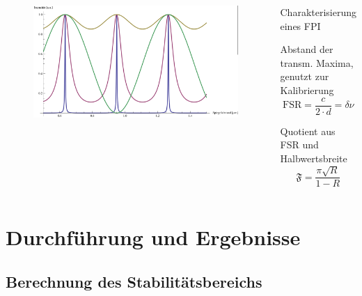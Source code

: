 \documentclass[10pt, aspectratio=169]{beamer}
\begin{document}
\begin{frame}
  \begin{columns}
    \begin{figure}
      \includegraphics[width=1\columnwidth]{fpitrans.png}
    \end{figure}
    \begin{block}{Charakterisierung eines FPI}
      \begin{description}
      \item<1->[Free Spectral Range (FSR)] Abstand der transm. Maxima,
        genutzt zur Kalibrierung 
        \begin{equation}
          \label{eq:fsr}
          \text{FSR} = \frac{c}{2\cdot d} = \delta\nu
        \end{equation}
      \item<2->[Finesse] Quotient aus FSR und Halbwertsbreite
        \begin{equation}
          \label{eq:finesse}
          \mathfrak{F} = \frac{\pi\sqrt{R}}{1-R}
        \end{equation}
      \end{description}
    \end{block}
  \end{columns}
\end{frame}

\section{Durchf\"uhrung und Ergebnisse}
\label{sec:durchf}

\subsection{Berechnung des Stabilit\"atsbereichs}
\label{sec:stab}
\end{document}
